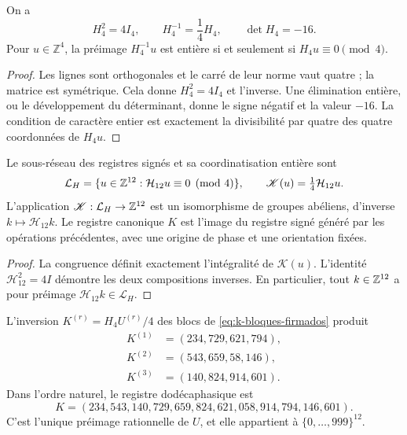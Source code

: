 \begin{lemma}
\label{lem:k-hadamard}
On a
\[
 H_4^2=4I_4,\qquad H_4^{-1}=\frac14H_4,\qquad\det H_4=-16.
\]
Pour \(u\in\mathbb Z^4\), la préimage \(H_4^{-1}u\) est entière si et
seulement si \(H_4u\equiv0\pmod4\).
\end{lemma}

\begin{proof}
Les lignes sont orthogonales et le carré de leur norme vaut quatre ; la matrice est symétrique. Cela donne \(H_4^2=4I_4\) et l'inverse. Une élimination entière, ou le développement du déterminant, donne le signe négatif et la valeur \(-16\). La condition de caractère entier est exactement la divisibilité par quatre des quatre coordonnées de \(H_4u\).
\end{proof}

\begin{definition}
Le sous-réseau des registres signés et sa coordinatisation entière sont
\[
 \mathcal L_H=\{u\in\mathbb Z^{12}:\mathcal H_{12}u\equiv0\pmod4\},
 \qquad \mathscr K(u)=\tfrac14\mathcal H_{12}u.
\]
L'application \(\mathscr K:\mathcal L_H\to\mathbb Z^{12}\) est un isomorphisme
de groupes abéliens, d'inverse \(k\mapsto\mathcal H_{12}k\).
Le registre canonique \(K\) est l'image du registre signé généré
par les opérations précédentes, avec une origine de phase et une orientation fixées.
\end{definition}

\begin{proof}
La congruence définit exactement l'intégralité de \(\mathscr K(u)\).
L'identité \(\mathcal H_{12}^2=4I\) démontre les deux compositions
inverses. En particulier, tout \(k\in\mathbb Z^{12}\) a pour préimage
\(\mathcal H_{12}k\in\mathcal L_H\).
\end{proof}

\begin{proposition}
\label{prop:k-sello}
L'inversion \(K^{(r)}=H_4U^{(r)}/4\) des blocs de
\eqref{eq:k-bloques-firmados} produit
\begin{align*}
 K^{(1)}&=(234,729,621,794),\\
 K^{(2)}&=(543,659,58,146),\\
 K^{(3)}&=(140,824,914,601).
\end{align*}
Dans l'ordre naturel, le registre dodécaphasique est
\begin{equation}
 K=(234,543,140,729,659,824,621,058,914,794,146,601).
 \label{eq:k-vector}
\end{equation}
C'est l'unique préimage rationnelle de \(U\), et elle appartient à \(\{0,\ldots,999\}^{12}\).
\end{proposition}

